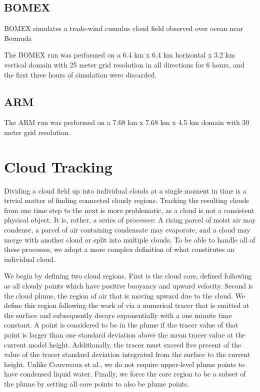 \documentclass[acp]{copernicus}
\begin{document}
\subsection{BOMEX}

BOMEX simulates a trade-wind cumulus cloud field observed over ocean near 
Bermuda

The BOMEX run was performed on a 6.4 km x 6.4 km horizontal x 3.2 km vertical 
domain with 25 meter grid resolution in all directions for 6 hours, and the 
first three hours of simulation were discarded. 

\subsection{ARM}

The ARM run was performed on a 7.68 km x 7.68 km x 4.5 km domain with 30 meter 
grid resolution.



\section{Cloud Tracking}

Dividing a cloud field up into individual clouds at a single moment in time is 
a trivial matter of finding connected cloudy regions.  Tracking the resulting 
clouds from one time step to the next is more problematic, as a cloud is not a 
consistent physical object.  It is, rather, a series of processes: A rising 
parcel of moist air may condense, a parcel of air containing condensate may 
evaporate, and a cloud may merge with another cloud or split into multiple 
clouds.  To be able to handle all of these processes, we adopt a more complex 
definition of what constitutes an individual cloud.

We begin by defining two cloud regions.  First is the cloud core, defined 
following \cite{Siebesma1995} as all cloudy points which have positive 
buoyancy and upward velocity.  Second is the cloud plume, the region of air 
that is moving upward due to the cloud.  We define this region following the 
work of \cite{Couvreaux2010} via a numerical tracer that is emitted at the 
surface and subsequently decays exponentially with a one minute time constant.  
A point is considered to be in the plume if the tracer value of that point is 
larger than one standard deviation above the mean tracer value at the current 
model height.  Additionally, the tracer must exceed five precent of the value 
of the tracer standard deviation integrated from the surface to the current 
height.  Unlike Couvreaux et al., we do not require upper-level plume points 
to have condensed liquid water.  Finally, we force the core region to be a 
subset of the plume by setting all core points to also be plume points.
\end{document}
